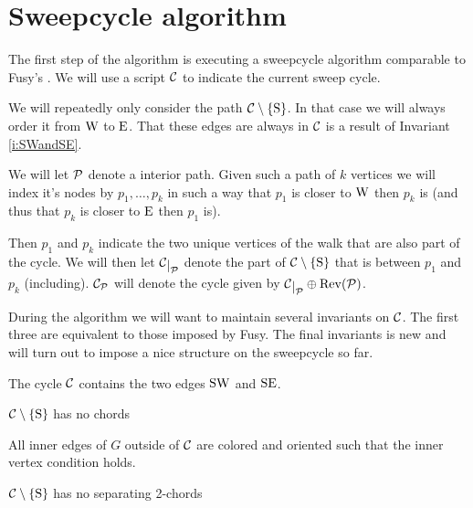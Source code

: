 
\section{Sweepcycle algorithm}
  The first step of the algorithm is executing a sweepcycle algorithm comparable to Fusy's \cite{Fusy2006}. We will use a script $\C$ to indicate the current sweep cycle.

  We will repeatedly only consider the path $\cpath$. In that case we will always order it from $\pW$ to $\pE$. That these edges are always in $\C$ is a result of Invariant \ref{i:SWandSE}.

  We will let $\P$ denote a interior path. Given such a path of $k$ vertices we will index it's nodes by $p_1, \ldots, p_k$ in such a way that $p_1$ is closer to $\pW$ then $p_k$ is (and thus that $p_k$ is closer to $\pE$ then $p_1$ is).

  Then $p_1$ and $p_k$ indicate the two unique vertices of the walk that are also part of the cycle. We will then let $\restC{\P}$ denote the part of $\cpath$ that is between $p_1$ and $p_k$ (including). $\C_\P$ will denote the cycle given by $\restC{\P} \oplus \rev(\P)$.

  During the algorithm we will want to maintain several invariants on $\C$. The first three are equivalent to those imposed by Fusy. The final invariants is new and will turn out to impose a nice structure on the sweepcycle so far.

  \begin{invariants}
    \itemsep=-4pt

    \item \label{i:uni:SWandSE} The cycle $\C$ contains the two edges $\pS \pW$ and $\pS \pE$.
    \item \label{i:uni:noChords} $\cpath$ has no chords
    \item \label{i:uni:intVertCond} All inner edges of $G$ outside of $\C$ are colored and oriented such that the inner vertex condition holds. 
    \item \label{i:uni:no2Chords} $\C\sm{\pS}$ has no separating 2-chords
  \end{invariants}


